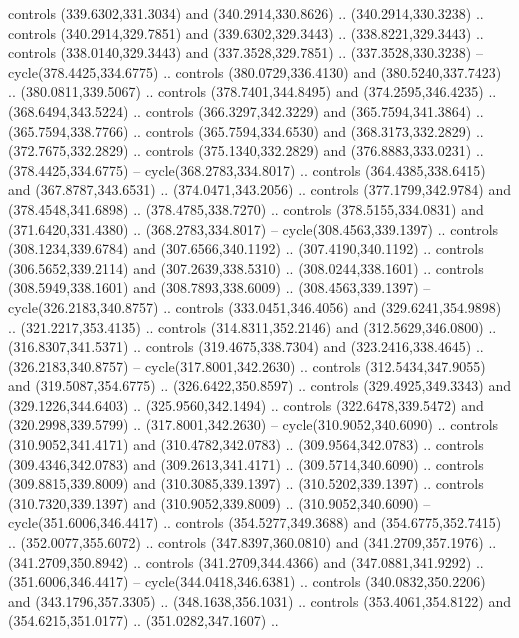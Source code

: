 \begin{scope}[cm={{1.25,0.0,0.0,-1.25,(0.0,743.43331)}}]
    controls (339.6302,331.3034) and (340.2914,330.8626) .. (340.2914,330.3238) ..
    controls (340.2914,329.7851) and (339.6302,329.3443) .. (338.8221,329.3443) ..
    controls (338.0140,329.3443) and (337.3528,329.7851) .. (337.3528,330.3238) --
    cycle(378.4425,334.6775) .. controls (380.0729,336.4130) and
    (380.5240,337.7423) .. (380.0811,339.5067) .. controls (378.7401,344.8495) and
    (374.2595,346.4235) .. (368.6494,343.5224) .. controls (366.3297,342.3229) and
    (365.7594,341.3864) .. (365.7594,338.7766) .. controls (365.7594,334.6530) and
    (368.3173,332.2829) .. (372.7675,332.2829) .. controls (375.1340,332.2829) and
    (376.8883,333.0231) .. (378.4425,334.6775) -- cycle(368.2783,334.8017) ..
    controls (364.4385,338.6415) and (367.8787,343.6531) .. (374.0471,343.2056) ..
    controls (377.1799,342.9784) and (378.4548,341.6898) .. (378.4785,338.7270) ..
    controls (378.5155,334.0831) and (371.6420,331.4380) .. (368.2783,334.8017) --
    cycle(308.4563,339.1397) .. controls (308.1234,339.6784) and
    (307.6566,340.1192) .. (307.4190,340.1192) .. controls (306.5652,339.2114) and
    (307.2639,338.5310) .. (308.0244,338.1601) .. controls (308.5949,338.1601) and
    (308.7893,338.6009) .. (308.4563,339.1397) -- cycle(326.2183,340.8757) ..
    controls (333.0451,346.4056) and (329.6241,354.9898) .. (321.2217,353.4135) ..
    controls (314.8311,352.2146) and (312.5629,346.0800) .. (316.8307,341.5371) ..
    controls (319.4675,338.7304) and (323.2416,338.4645) .. (326.2183,340.8757) --
    cycle(317.8001,342.2630) .. controls (312.5434,347.9055) and
    (319.5087,354.6775) .. (326.6422,350.8597) .. controls (329.4925,349.3343) and
    (329.1226,344.6403) .. (325.9560,342.1494) .. controls (322.6478,339.5472) and
    (320.2998,339.5799) .. (317.8001,342.2630) -- cycle(310.9052,340.6090) ..
    controls (310.9052,341.4171) and (310.4782,342.0783) .. (309.9564,342.0783) ..
    controls (309.4346,342.0783) and (309.2613,341.4171) .. (309.5714,340.6090) ..
    controls (309.8815,339.8009) and (310.3085,339.1397) .. (310.5202,339.1397) ..
    controls (310.7320,339.1397) and (310.9052,339.8009) .. (310.9052,340.6090) --
    cycle(351.6006,346.4417) .. controls (354.5277,349.3688) and
    (354.6775,352.7415) .. (352.0077,355.6072) .. controls (347.8397,360.0810) and
    (341.2709,357.1976) .. (341.2709,350.8942) .. controls (341.2709,344.4366) and
    (347.0881,341.9292) .. (351.6006,346.4417) -- cycle(344.0418,346.6381) ..
    controls (340.0832,350.2206) and (343.1796,357.3305) .. (348.1638,356.1031) ..
    controls (353.4061,354.8122) and (354.6215,351.0177) .. (351.0282,347.1607) ..

\end{scope}
